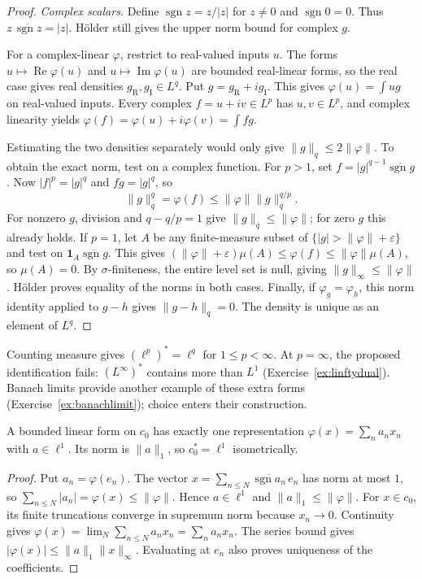 \begin{proof}
\emph{Complex scalars.} Define $\operatorname{sgn}z=z/|z|$ for $z\ne0$ and $\operatorname{sgn}0=0$. Thus $z\,\overline{\operatorname{sgn}z}=|z|$. H\"older still gives the upper norm bound for complex $g$.

For a complex-linear $\varphi$, restrict to real-valued inputs $u$. The forms $u\mapsto\operatorname{Re}\varphi(u)$ and $u\mapsto\operatorname{Im}\varphi(u)$ are bounded real-linear forms, so the real case gives real densities $g_{\mathrm R},g_{\mathrm I}\in L^q$. Put $g=g_{\mathrm R}+ig_{\mathrm I}$. This gives $\varphi(u)=\int ug$ on real-valued inputs. Every complex $f=u+iv\in L^p$ has $u,v\in L^p$, and complex linearity yields $\varphi(f)=\varphi(u)+i\varphi(v)=\int fg$.

Estimating the two densities separately would only give $\|g\|_q\le2\|\varphi\|$. To obtain the exact norm, test on a complex function. For $p>1$, set $f=|g|^{q-1}\overline{\operatorname{sgn}g}$. Now $|f|^p=|g|^q$ and $fg=|g|^q$, so
\[\|g\|_q^q=\varphi(f)\le\|\varphi\|\|g\|_q^{q/p}.\]
For nonzero $g$, division and $q-q/p=1$ give $\|g\|_q\le\|\varphi\|$; for zero $g$ this already holds. If $p=1$, let $A$ be any finite-measure subset of $\{|g|>\|\varphi\|+\varepsilon\}$ and test on $\mathbf 1_A\overline{\operatorname{sgn}g}$. This gives $(\|\varphi\|+\varepsilon)\mu(A)\le\varphi(f)\le\|\varphi\|\mu(A)$, so $\mu(A)=0$. By $\sigma$-finiteness, the entire level set is null, giving $\|g\|_\infty\le\|\varphi\|$. H\"older proves equality of the norms in both cases. Finally, if $\varphi_g=\varphi_h$, this norm identity applied to $g-h$ gives $\|g-h\|_q=0$. The density is unique as an element of $L^q$.
\end{proof}

Counting measure gives $(\ell^p)^*=\ell^q$ for $1\le p<\infty$. At $p=\infty$, the proposed identification fails: $(L^\infty)^*$ contains more than $L^1$ (Exercise~\ref{ex:linftydual}). Banach limits provide another example of these extra forms (Exercise~\ref{ex:banachlimit}); choice enters their construction.

\begin{proposition}\label{prop:c0dual}
A bounded linear form on $c_0$ has exactly one representation $\varphi(x)=\sum_na_nx_n$ with $a\in\ell^1$. Its norm is $\|a\|_1$, so $c_0^*=\ell^1$ isometrically.
\end{proposition}
\begin{proof}
Put $a_n=\varphi(e_n)$. The vector $x=\sum_{n\le N}\overline{\operatorname{sgn}a_n}\,e_n$ has norm at most $1$, so $\sum_{n\le N}|a_n|=\varphi(x)\le\|\varphi\|$. Hence $a\in\ell^1$ and $\|a\|_1\le\|\varphi\|$. For $x\in c_0$, its finite truncations converge in supremum norm because $x_n\to0$. Continuity gives $\varphi(x)=\lim_N\sum_{n\le N}a_nx_n=\sum_na_nx_n$. The series bound gives $|\varphi(x)|\le\|a\|_1\|x\|_\infty$. Evaluating at $e_n$ also proves uniqueness of the coefficients.
\end{proof}

